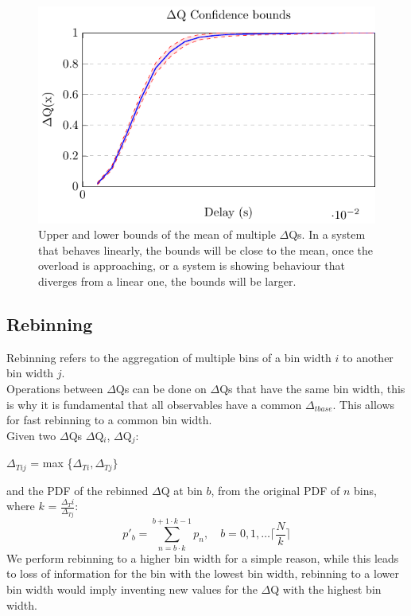         \begin{figure}[H]
            \begin{center}
                \includegraphics[scale=1.5]{tikz/ci.pdf} 
            \end{center}
            \caption{Upper and lower bounds of the mean of multiple $\Delta$Qs. In a system that behaves linearly, the bounds will be close to the mean, once the overload is approaching, or a system is showing behaviour that diverges from a linear one, the bounds will be larger.}
        \end{figure}
    \subsection{Rebinning}
        Rebinning refers to the aggregation of multiple bins of a bin width $i$ to another bin width $j$. \\  
        Operations between $\Delta$Qs can be done on $\Delta$Qs that have the same bin width, this is why it is fundamental that all observables have a common $\Delta_{tbase}$. This allows for fast rebinning to a common bin width. \\
        Given two $\Delta$Qs $\Delta$Q$_i$, $\Delta$Q$_j$:
        \begin{center}
            $\Delta_{Tij}$ = max \{$\Delta_{Ti}, \Delta_{Tj} \}$
        \end{center}
        and the PDF of the rebinned $\Delta$Q at bin $b$, from the original PDF of $n$ bins, where $k$ = $\frac{\Delta{_Ti}}{\Delta_{Tj}}$:
        \begin{equation}
            p'_b = \sum_{n=b \cdot k}^{b+ 1 \cdot k - 1} p_n, \quad b=0,1,\dots \lceil \frac{N}{k} \rceil  
        \end{equation}
        We perform rebinning to a higher bin width for a simple reason, while this leads to loss of information for the bin with the lowest bin width, rebinning to a lower bin width would imply inventing new values for the $\Delta$Q with the highest bin width.
       
